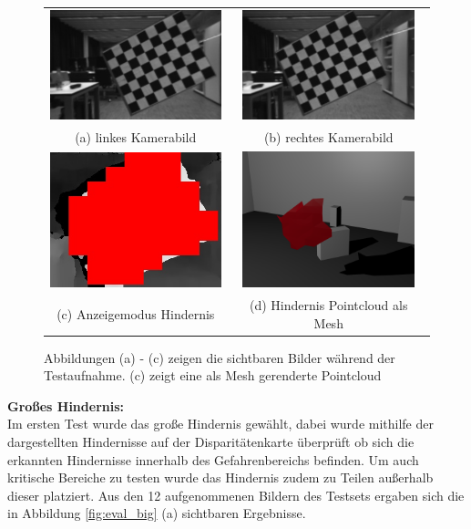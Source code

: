 \begin{figure}[h]
	\centering
	\begin{tabular}{c c}
	\includegraphics[width=5.0cm]{img/evaluation/test_set/_test_3_left}&
	\includegraphics[width=5.0cm]{img/evaluation/test_set/_test_3_right}\\
	(a) linkes Kamerabild & (b) rechtes Kamerabild\\
	\includegraphics[width=5.0cm]{img/evaluation/test_set/_test_3_disparity}&
    \includegraphics[width=5.0cm]{img/evaluation/test_set/rendered_obstacle}\\
	(c) Anzeigemodus Hindernis & (d) Hindernis Pointcloud als Mesh
	\end{tabular}
	\caption{Abbildungen (a) - (c) zeigen die sichtbaren Bilder während der Testaufnahme. (c) zeigt eine als Mesh gerenderte Pointcloud}
	\label{fig:test_viewing}
\end{figure}


\noindent
\textbf{Großes Hindernis:}\\ 
\noindent
Im ersten Test wurde das große Hindernis gewählt, dabei wurde mithilfe der dargestellten Hindernisse auf der Disparitätenkarte überprüft ob sich die erkannten Hindernisse innerhalb des Gefahrenbereichs befinden. Um auch kritische Bereiche zu testen wurde das Hindernis zudem zu Teilen außerhalb dieser platziert. Aus den 12 aufgenommenen Bildern des Testsets ergaben sich die in Abbildung \ref{fig:eval_big} (a) sichtbaren Ergebnisse.\\

